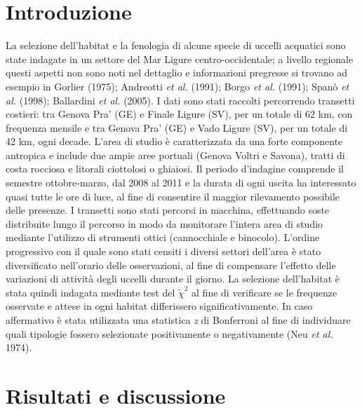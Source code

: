 \section*{Introduzione}
La selezione dell{\textquoteright}habitat e la fenologia di alcune
specie di uccelli acquatici sono state indagate in un settore del Mar
Ligure centro-occidentale; a livello regionale questi aspetti non sono
noti nel dettaglio e informazioni pregresse si trovano ad esempio in
Gorlier (1975); Andreotti \textit{et al.} (1991);  Borgo \textit{et
al.} (1991); Span\`o \textit{et al.} (1998); Ballardini \textit{et al.}
(2005). I dati sono stati raccolti percorrendo transetti costieri: tra
Genova Pra{\textquoteright} (GE) e Finale Ligure (SV), per un totale di
62 km, con frequenza mensile e tra Genova Pra{\textquoteright} (GE) e
Vado Ligure (SV), per un totale di 42 km, ogni decade.
L{\textquoteright}area di studio \`e caratterizzata da una forte
componente antropica e include due ampie aree portuali (Genova Voltri e
Savona), tratti di costa rocciosa e litorali ciottolosi o ghiaiosi. Il
periodo d{\textquoteright}indagine comprende il semestre ottobre-marzo,
dal 2008 al 2011 e la durata di ogni uscita ha interessato quasi tutte
le ore di luce, al fine di consentire il maggior rilevamento possibile
delle presenze. I transetti sono stati percorsi in macchina,
effettuando soste distribuite lungo il percorso in modo da monitorare
l{\textquoteright}intera area di studio mediante
l{\textquoteright}utilizzo di strumenti ottici (cannocchiale e
binocolo). L{\textquoteright}ordine progressivo con il quale sono stati
censiti i diversi settori dell{\textquoteright}area \`e stato
diversificato nell{\textquoteright}orario delle osservazioni,  al fine
di compensare l{\textquoteright}effetto delle variazioni di attivit\`a
degli uccelli durante il giorno. La selezione
dell{\textquoteright}habitat \`e stata quindi indagata mediante test
del $\tilde\chi^2$ al fine di verificare se le frequenze osservate e
attese in ogni habitat differissero significativamente. In caso
affermativo \`e stata utilizzata una statistica \textit{z} di
Bonferroni al fine di individuare quali tipologie fossero selezionate
positivamente o negativamente (Neu \textit{et al.} 1974).

\section*{Risultati e discussione}

